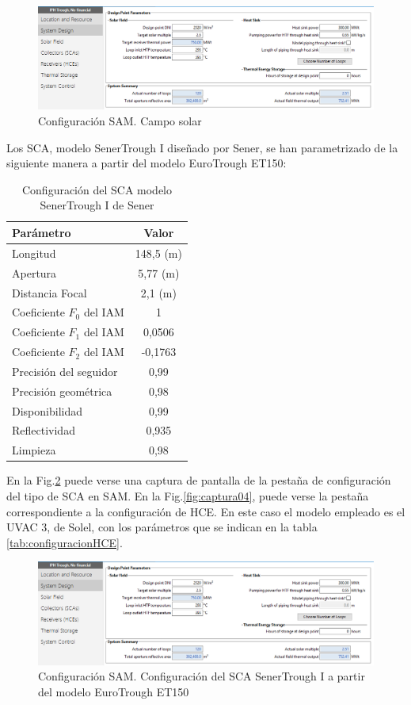 \begin{figure}[H]
\includegraphics[width=0.9\linewidth]{images/captura_sam_iph02.png}
\caption{Configuración SAM. Campo solar} 
\label{fig:captura02}
\end{figure}

Los SCA, modelo SenerTrough I diseñado por Sener, se han parametrizado de la siguiente manera a partir del modelo EuroTrough ET150:

\begin{table}[H]
\centering
\caption{Configuración del SCA modelo SenerTrough I de Sener}
\label{tab:configuracionSCA}
\begin{tabular}{lc}
Parámetro & Valor \\ \hline
Longitud &  148,5  (m) \\
Apertura &  5,77  (m) \\
Distancia Focal & 2,1 (m) \\
Coeficiente $F_{0}$ del  IAM  &  1 \\
Coeficiente $F_{1}$ del  IAM  &  0,0506 \\
Coeficiente $F_{2}$ del  IAM  &  -0,1763 \\
Precisión del seguidor &  0,99 \\
Precisión geométrica &  0,98 \\
Disponibilidad &  0,99 \\
Reflectividad &  0,935 \\
Limpieza &  0,98
\end{tabular}
\end{table}


En la Fig.\ref{fig:captura03} puede verse una captura de pantalla de la pestaña de configuración del tipo de SCA en SAM. En la Fig.\ref{fig:captura04}, puede verse la pestaña correspondiente a la configuración de HCE. En este caso el modelo empleado es el UVAC 3, de Solel, con los parámetros que se indican en la tabla \ref{tab:configuracionHCE}.


\begin{figure}[H]
\includegraphics[width=0.9\linewidth]{images/captura_sam_iph02.png}
\caption{Configuración SAM. Configuración del SCA SenerTrough I a partir del modelo EuroTrough ET150} 
\label{fig:captura03}
\end{figure}

